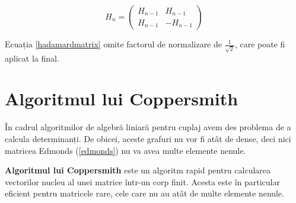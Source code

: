 \begin{equation}
  \label{hadamardmatrix}
  H_{n} =
  \begin{pmatrix}
    H_{n-1} & H_{n-1}\\
    H_{n-1} & -H_{n-1}
  \end{pmatrix}
\end{equation}

Ecuația \ref{hadamardmatrix} omite factorul de normalizare de
$\frac{1}{\sqrt{2}}$, care poate fi aplicat la final.

\begin{algorithm}[H]
  \DontPrintSemicolon
  \;
\end{algorithm}

\begin{algorithm}[H]
  \DontPrintSemicolon
  \;
\end{algorithm}

\pagebreak

\section{Algoritmul lui Coppersmith}
\label{coppersmith}

În cadrul algoritmilor de algebră liniară pentru cuplaj avem des problema de a
calcula determinanți. De obicei, aceste grafuri nu vor fi atât de dense, deci
nici matricea Edmonds (\ref{edmonds}) nu va avea multe elemente nenule.

\textbf{Algoritmul lui Coppersmith} \cite{wiedemann} este un algoritm rapid pentru calcularea
vectorilor nucleu al unei matrice într-un corp finit. Acesta este în particular
eficient pentru matricele rare, cele care nu au atât de multe elemente nenule. \\


